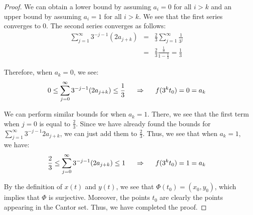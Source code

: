 \documentclass[psamsfonts]{amsart}
\theoremstyle{definition}
\theoremstyle{remark}
\numberwithin{equation}{section}
\begin{document}
\begin{proof}
We can obtain a lower bound by assuming $a_i = 0$ for all $i > k$ and an upper bound by assuming $a_i = 1$ for all $i > k$. We see that the first series converges to $0$. The second series converges as follows:
\begin{eqnarray}
\sum_{j=1}^\infty 3^{-j-1} (2 a_{j+k}) &=& \frac{2}{3} \sum_{j=1}^\infty \frac{1}{3^j} \\
&=& \frac{2}{3} \frac{ \frac{1}{3}}{1 - \frac{1}{3}} = \frac{1}{3}
\end{eqnarray}

Therefore, when $a_k = 0$, we see:
\begin{eqnarray}
0 \leq \sum_{j=0}^\infty 3^{-j-1} (2 a_{j+k}) \leq \frac{1}{3} \hspace{0.5cm} \Rightarrow \hspace{0.5cm} f(3^k t_0) = 0 = a_k
\end{eqnarray}

We can perform similar bounds for when $a_k = 1$. There, we see that the first term when $j=0$ is equal to $\frac{2}{3}$. Since we have already found the bounds for $\sum_{j=1}^\infty 3^{-j-1} 2 a_{j+k}$, we can just add them to $\frac{2}{3}$. Thus, we see that when $a_k = 1$, we have:
\begin{eqnarray}
\frac{2}{3} \leq \sum_{j=0}^\infty 3^{-j-1} (2 a_{j+k}) \leq 1 \hspace{0.5cm} \Rightarrow \hspace{0.5cm} f(3^k t_0) = 1 = a_k
\end{eqnarray}

By the definition of $x(t)$ and $y(t)$, we see that $\Phi(t_0) = (x_0, y_0)$, which implies that $\Phi$ is surjective. Moreover, the points $t_0$ are clearly the points appearing in the Cantor set. Thus, we have completed the proof.
\end{proof}
\end{document}

